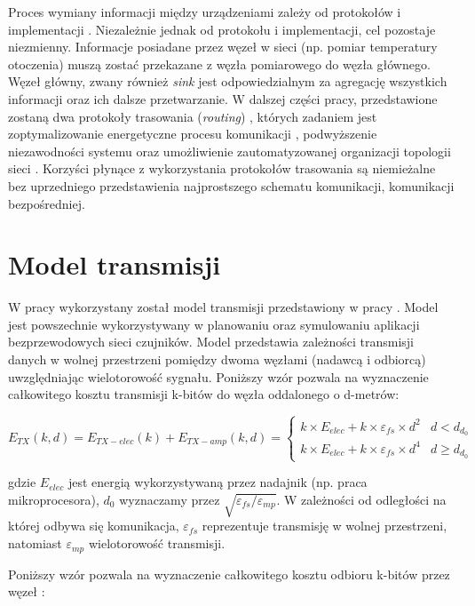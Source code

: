 \documentclass[a4paper,12pt,twoside,openany]{report}
\begin{document}
Proces wymiany informacji między urządzeniami zależy od protokołów i implementacji \cite{Shen}.
Niezależnie jednak od protokołu i implementacji, cel pozostaje niezmienny. Informacje posiadane przez węzeł w sieci (np. pomiar temperatury otoczenia) muszą zostać przekazane z węzła pomiarowego 
do węzła głównego. Węzeł główny, zwany również \textit{sink} jest odpowiedzialnym za agregację wszystkich informacji oraz ich dalsze przetwarzanie.  
W dalszej części pracy, przedstawione zostaną dwa protokoły trasowania (\textit{routing}) \cite{WSN-routing}, których zadaniem jest zoptymalizowanie energetyczne procesu komunikacji \cite{Heinzelman} \cite{EnergyAwareRouting}, podwyższenie niezawodności systemu 
oraz umożliwienie zautomatyzowanej organizacji topologii sieci \cite{Rodoplu}.
Korzyści płynące z wykorzystania protokołów trasowania są niemieżalne bez uprzedniego przedstawienia najprostszego schematu komunikacji, komunikacji bezpośredniej.

\section{Model transmisji}

W pracy wykorzystany został model transmisji przedstawiony w pracy \cite{Heinzelman}.
Model jest powszechnie wykorzystywany w planowaniu oraz symulowaniu aplikacji bezprzewodowych sieci czujników.
Model przedstawia zależności transmisji danych w wolnej przestrzeni pomiędzy dwoma węzłami (nadawcą i odbiorcą) uwzględniając wielotorowość sygnału.
Poniższy wzór pozwala na wyznaczenie całkowitego kosztu transmisji k-bitów do węzła oddalonego o d-metrów:

\[
E_{TX}(k,d) = E_{TX-elec}(k) + E_{TX-amp}(k,d) = \begin{cases}
 k \times E_{elec} + k \times \varepsilon_{fs} \times d^2 & d < d_{d_{0}}\\
 k \times E_{elec} + k \times \varepsilon_{fs} \times d^4 & d \geq d_{d_{0}}
\end{cases}
\]

gdzie $E_{elec}$ jest energią wykorzystywaną przez nadajnik (np. praca mikroprocesora), $d_{0}$ wyznaczamy przez $\sqrt{\varepsilon_{fs} / \varepsilon_{mp}}$.
W zależności od odległości na której odbywa się komunikacja, $\varepsilon_{fs}$ reprezentuje transmisję w wolnej przestrzeni, natomiast $\varepsilon_{mp}$
wielotorowość transmisji.

Poniższy wzór pozwala na wyznaczenie całkowitego kosztu odbioru k-bitów przez węzeł \cite{Heinzelman}:
\end{document}
